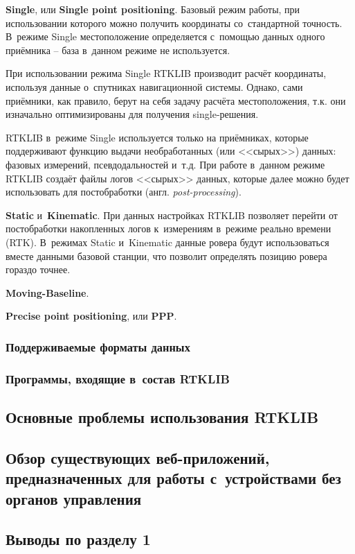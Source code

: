 \begin{dashitemize}
  \item \textbf{Single}, или \textbf{Single point positioning}. Базовый режим работы, при использовании которого можно получить координаты со~стандартной точность. В~режиме Single местоположение определяется с~помощью данных одного приёмника -- база в~данном режиме не используется. \par
  При использовании режима Single RTKLIB производит расчёт координаты, используя данные о~спутниках навигационной системы. Однако, сами приёмники, как правило, берут на себя задачу расчёта местоположения, т.к. они изначально оптимизированы для получения single-решения. \par
  RTKLIB в~режиме Single используется только на приёмниках, которые поддерживают функцию выдачи необработанных (или <<сырых>>) данных: фазовых измерений, псевдодальностей и~т.д. При работе в~данном режиме RTKLIB создаёт файлы логов <<сырых>> данных, которые далее можно будет использовать для постобработки (англ. \emph{post-processing}).
  \item \textbf{Static} и~\textbf{Kinematic}. При данных настройках RTKLIB позволяет перейти от постобработки накопленных логов к~измерениям в~режиме реально времени (RTK). В~режимах Static и~Kinematic данные ровера будут использоваться вместе данными базовой станции, что позволит определять позицию ровера гораздо точнее. \par
  
  \item \textbf{Moving-Baseline}.
  \item \textbf{Precise point positioning}, или \textbf{PPP}.
\end{dashitemize}

\subsubsection{Поддерживаемые форматы данных}
\subsubsection{Программы, входящие в~состав RTKLIB}

\subsection{Основные проблемы использования RTKLIB}

\subsection{Обзор существующих веб-приложений, предназначенных для работы с~устройствами без органов управления}

\subsection{Выводы по разделу 1}

\newpage
